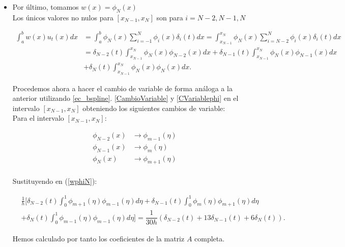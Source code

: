 \begin{itemize}
    \item Por último, tomamos $w(x)=\phi_{N}(x)$\\
    
    Los únicos valores no nulos para $[x_{N-1},x_{N}]$ son para $i=N-2,N-1,N$

\begin{equation}
\label{wphiN}
\begin{split}
    \int_{a}^{b}w(x)u_{t}(x)dx & =\int_{a}^{b}\phi_{N}(x)\sum_{i=-1}^{N}\phi_{i}(x)\delta_{i}(t)dx =\int_{x_{N-1}}^{x_{N}}\phi_{N}(x)\sum_{i=N-2}^{N}\phi_{i}(x)\delta_{i}(t)dx\\
    & =\delta_{N-2}(t)\int_{x_{N-1}}^{x_{N}}\phi_{N}(x)\phi_{N-2}(x)dx +\delta_{N-1}(t)\int_{x_{N-1}}^{x_{N}}\phi_{N}(x)\phi_{N-1}(x)dx\\
    & +\delta_{N}(t)\int_{x_{N-1}}^{x_{N}}\phi_{N}(x)\phi_{N}(x)dx.
    \end{split}
\end{equation}

Procedemos ahora a hacer el cambio de variable de forma análoga a la anterior utilizando \ref{ec_bspline}. \ref{CambioVariable} y \ref{CVariablephi} en el intervalo $[x_{N-1},x_{N}]$ obteniendo los siguientes cambios de variable:\\

Para el intervalo $[x_{N-1},x_{N}]$:


\begin{align*}
    \phi_{N-2}(x) & \rightarrow \phi_{m-1}(\eta)\\
    \phi_{N-1}(x) &\rightarrow \phi_{m}(\eta)\\
    \phi_{N}(x) &\rightarrow \phi_{m+1}(\eta)\\
\end{align*}

Sustituyendo en (\ref{wphiN}):

\begin{align*}
   &\frac{1}{h}\Bigg[\delta_{N-2}(t)\int_{0}^{1}\phi_{m+1}(\eta)\phi_{m-1}(\eta)d\eta + \delta_{N-1}(t)\int_{0}^{1}\phi_{m}(\eta)\phi_{m+1}(\eta)d\eta\\
    & +\delta_{N}(t)\int_{0}^{1}\phi_{m-1}(\eta)\phi_{m-1}(\eta)d\eta\Bigg]=\dfrac{1}{30h}(\delta_{N-2}(t)+13\delta_{N-1}(t)+6\delta_{N}(t)).
\end{align*}
  
  Hemos calculado por tanto los coeficientes de la matriz $A$ completa.
  
\end{itemize}


